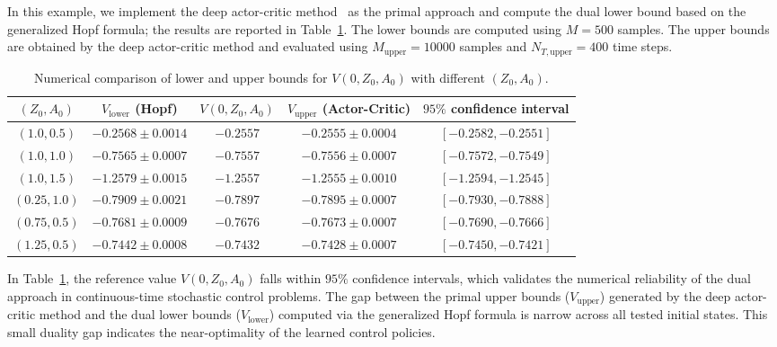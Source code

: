 \documentclass[11pt]{article}
\numberwithin{equation}{section}
\theoremstyle{plain}
\theoremstyle{definition}
\theoremstyle{remark}
\begin{document}
In this example, we implement the deep actor-critic method~\cite{zhou2024solving} as the primal approach and compute the dual lower bound based on the generalized Hopf formula; the results are reported in Table~\ref{tab:bounds-aiyagari}. The lower bounds are computed using $M=500$ samples. The upper bounds are obtained by the deep actor-critic method and evaluated using $M_{\text{upper}} = 10000$ samples and $N_{T,\text{upper}} = 400$ time steps. 

\begin{table}[htbp!]
    \centering
    \begin{tabular}{ccccc}
        \hline 
        $(Z_0, A_0)$ & $V_{\text{lower}}$ (Hopf) & $V(0, Z_0, A_0)$ & $V_{\text{upper}}$ (Actor-Critic) & $95\%$ confidence interval \\
        \hline 
        $(1.0, 0.5)$ & $-0.2568 \pm 0.0014$ & $-0.2557$ & $-0.2555 \pm 0.0004$ & $[-0.2582, -0.2551]$ \\
        $(1.0, 1.0)$ & $-0.7565 \pm 0.0007$ & $-0.7557$ & $-0.7556 \pm 0.0007$ & $[-0.7572, -0.7549]$ \\
        $(1.0, 1.5)$ & $-1.2579 \pm 0.0015$ & $-1.2557$ & $-1.2555 \pm 0.0010$ & $[-1.2594, -1.2545]$  \\
        $(0.25, 1.0)$ & $-0.7909 \pm 0.0021$ & $-0.7897$ & $-0.7895 \pm 0.0007$ & $[-0.7930, -0.7888]$ \\
        $(0.75, 0.5)$ & $-0.7681 \pm 0.0009$ & $-0.7676$ & $-0.7673 \pm 0.0007$ & $[-0.7690, -0.7666]$ \\
        $(1.25, 0.5)$ & $-0.7442 \pm 0.0008$ & $-0.7432$ & $-0.7428 \pm 0.0007$ & $[-0.7450, -0.7421]$ \\
        \hline 
    \end{tabular}
    \caption{Numerical comparison of lower and upper bounds for $V(0,Z_0,A_0)$ with different $(Z_0,A_0)$.}
    \label{tab:bounds-aiyagari}
\end{table}

In Table~\ref{tab:bounds-aiyagari}, the reference value $V(0, Z_0, A_0)$ falls within $95\%$ confidence intervals, which validates the numerical reliability of the dual approach in continuous-time stochastic control problems. The gap between the primal upper bounds ($V_{\text{upper}}$) generated by the deep actor-critic method and the dual lower bounds ($V_{\text{lower}}$) computed via the generalized Hopf formula is narrow across all tested initial states. This small duality gap indicates the near-optimality of the learned control policies. 
\end{document}
